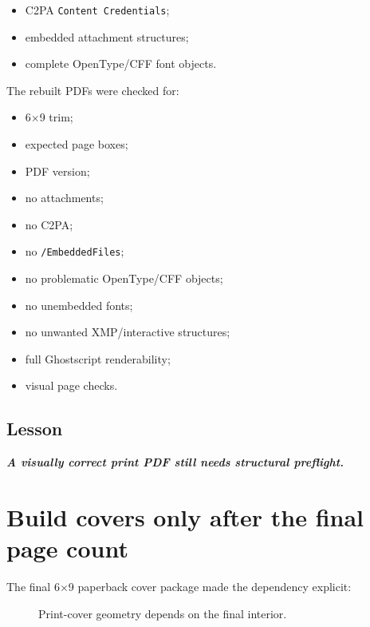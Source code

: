\documentclass[11pt,oneside,openany]{book}
\newcommand{\passthrough}[1]{#1}
\renewenvironment{quote}{\begin{insightbox}\itshape}{\end{insightbox}}
\providecommand{\tightlist}{%
  \setlength{\itemsep}{0pt}\setlength{\parskip}{0pt}}
\begin{document}
\begin{itemize}
\tightlist
\item
  C2PA \passthrough{\lstinline!Content Credentials!};
\item
  embedded attachment structures;
\item
  complete OpenType/CFF font objects.
\end{itemize}

The rebuilt PDFs were checked for:

\begin{itemize}
\tightlist
\item
  6\ensuremath{\times}9 trim;
\item
  expected page boxes;
\item
  PDF version;
\item
  no attachments;
\item
  no C2PA;
\item
  no \passthrough{\lstinline!/EmbeddedFiles!};
\item
  no problematic OpenType/CFF objects;
\item
  no unembedded fonts;
\item
  no unwanted XMP/interactive structures;
\item
  full Ghostscript renderability;
\item
  visual page checks.
\end{itemize}

\section{Lesson}\label{lesson}

\begin{quote}
\textbf{A visually correct print PDF still needs structural preflight.}

\end{quote}

\chapter{Build covers only after the final page count}

The final 6\ensuremath{\times}9 paperback cover package made the dependency explicit:

\begin{figure}[htbp]
\centering
{}
\caption{Print-cover geometry depends on the final interior.}
\end{figure}
\end{document}
